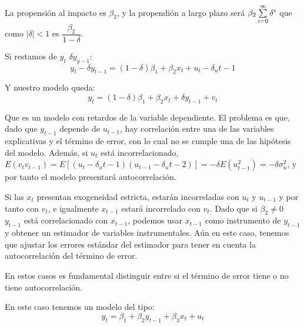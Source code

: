 La propensi\'on al impacto es $\beta_2$, y la propendi\'on a largo plazo ser\'a $\beta_2\sum_{i=0}^{\infty}\limits\delta^i$ que como $|\delta|<1$ es $\dfrac{\beta_2}{1-\delta}$.

Si restamos de $y_t$ $\delta y_{y-1}$:
\[y_t-\delta y_{t-1}=(1-\delta)\beta_1+\beta_2x_t+u_t-\delta_u{t-1}\]

Y nuestro modelo queda:
\[y_t=(1-\delta)\beta_1+\beta_2x_t+\delta y_{t-1}+v_t\]

Que es un modelo con retardos de la variable dependiente. El problema es que, dado que $y_{t-1}$ depende de $u_{t-1}$, hay correlaci\'on entre una de las variables explicativas y el t\'ermino de error, con lo cual no se cumple una de las hip\'otesis del modelo. Adem\'as, si $u_t$ est\'a incorrelacionado, $E(v_tv_{t-1})=E[(u_t-\delta_u{t-1})(u_{t-1}-\delta_u{t-2})]=-\delta E(u_{t-1}^2)=-\delta\sigma_u^2$, y por tanto el modelo presentar\'a autocorrelaci\'on.

Si las $x_t$ presentan exogeneidad estricta, estar\'an incorreladas con $u_t$ y $u_{t-1}$ y por tanto con $v_t$, e igualmente $x_{t-1}$ estar\'a incorrelado con $v_t$. Dado que si $\beta_2\neq 0$ $y_{t-1}$ est\'a correlacionado con $x_{t-1}$, podemos usar $x_{t-1}$ como instrumento de $y_{t-1}$ y obtener un estimador de variables instrumentales. A\'un en este caso, tenemos que ajustar los errores est\'andar del estimador para tener en cuenta la autocorrelaci\'on del t\'ermino de error.
%
%
%
%





En estos casos es fundamental distinguir entre si el t\'ermino de error tiene o no tiene autocorrelaci\'on.

En este caso tenemos un modelo del tipo:
\[y_t=\beta_1+\beta_2y_{t-1}+\beta_3x_t+u_t\]

